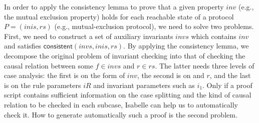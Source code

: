 \documentclass[final]{IEEEtran}
\begin{document}
In order to  apply the consistency lemma to prove that a given property $inv$ (e.g., the mutual exclusion property) holds for each reachable state of a protocol $P=(inis,rs)$ (e.g., mutual-exclusion protocol), we need to solve two problems. First, we need to construct a set of auxiliary invariants $invs$ which contains $inv$ and satisfies  $\mathsf{consistent}( invs, inis, rs)$.  By applying the consistency lemma, we  decompose the original problem of invariant checking into that of checking the causal relation between some $f\in invs$ and $r \in rs$. The latter needs three levels of case analysis: the first is on the form of $inv$, the second is on  and $r$, and the last is on the rule parameters $iR$ and invariant parameters such as $i_1$.  Only if a proof script contains sufficient information on the case splitting and  the kind of causal relation to be checked in each subcase, Isabelle can help us to automatically  check it. How to  generate automatically such a proof is the second problem.

\end{document}
